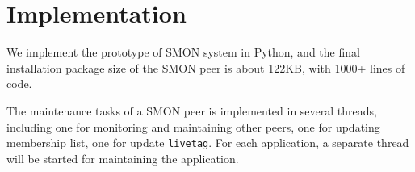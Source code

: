 \section{Implementation}
\label{sec:impl}

We implement the prototype of SMON system in Python, and the
final installation package size of the SMON peer is about
122KB, with 1000+ lines of code.

%
%
%
%
%
%
%
%
%
%
%
%
%

The maintenance tasks of a SMON peer is implemented in
several threads, including one for monitoring and
maintaining other peers, one for updating membership list,
one for update \texttt{livetag}. For each application, a
separate thread will be started for maintaining the
application.


